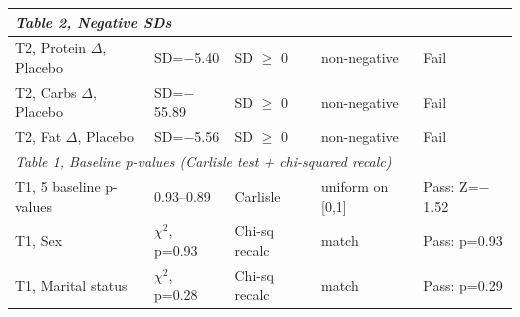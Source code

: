 \documentclass[11pt]{article}
\begin{document}
\begin{longtable}{p{3.5cm}p{2.2cm}p{1.8cm}p{2.5cm}p{2.5cm}}
\multicolumn{5}{l}{\textit{Table 2, Negative SDs}} \\
\midrule
T2, Protein $\Delta$, Placebo & SD=$-$5.40 & SD $\geq$ 0 & non-negative & \textcolor{fail}{Fail} \\
T2, Carbs $\Delta$, Placebo & SD=$-$55.89 & SD $\geq$ 0 & non-negative & \textcolor{fail}{Fail} \\
T2, Fat $\Delta$, Placebo & SD=$-$5.56 & SD $\geq$ 0 & non-negative & \textcolor{fail}{Fail} \\
\midrule

\multicolumn{5}{l}{\textit{Table 1, Baseline p-values (Carlisle test + chi-squared recalc)}} \\
\midrule
T1, 5 baseline p-values & 0.93--0.89 & Carlisle & uniform on [0,1] & \textcolor{pass}{Pass: Z=$-$1.52} \\
T1, Sex & $\chi^2$, p=0.93 & Chi-sq recalc & match & \textcolor{pass}{Pass: p=0.93} \\
T1, Marital status & $\chi^2$, p=0.28 & Chi-sq recalc & match & \textcolor{pass}{Pass: p=0.29} \\

\bottomrule
\end{longtable}
\normalsize
\end{document}
